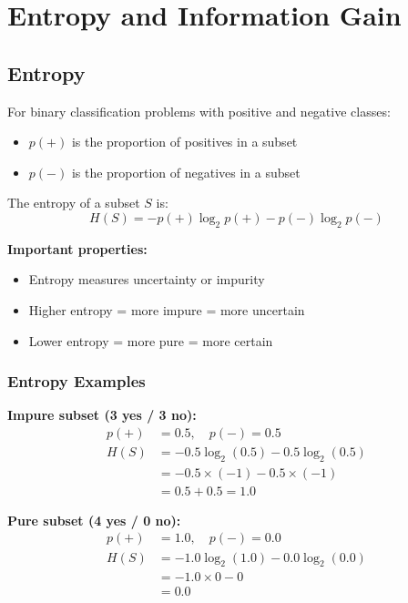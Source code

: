 \documentclass[11pt,a4paper]{article}
\theoremstyle{definition}
\theoremstyle{plain}
\theoremstyle{remark}
\begin{document}
\section{Entropy and Information Gain}

\subsection{Entropy}

For binary classification problems with positive and negative classes:

\begin{itemize}
    \item \(p(+)\) is the proportion of positives in a subset
    \item \(p(-)\) is the proportion of negatives in a subset
\end{itemize}

\begin{tcolorbox}[colback=green!5!white,colframe=green!75!black,title=\textbf{Entropy Formula}]
The entropy of a subset \(S\) is:
\[
H(S) = -p(+) \log_2 p(+) - p(-) \log_2 p(-)
\]
\end{tcolorbox}

\textbf{Important properties:}
\begin{itemize}
    \item Entropy measures uncertainty or impurity
    \item Higher entropy = more impure = more uncertain
    \item Lower entropy = more pure = more certain
\end{itemize}

\subsubsection{Entropy Examples}

\textbf{Impure subset (3 yes / 3 no):}
\begin{align*}
p(+) &= 0.5, \quad p(-) = 0.5 \\
H(S) &= -0.5 \log_2(0.5) - 0.5 \log_2(0.5) \\
&= -0.5 \times (-1) - 0.5 \times (-1) \\
&= 0.5 + 0.5 = 1.0
\end{align*}

\textbf{Pure subset (4 yes / 0 no):}
\begin{align*}
p(+) &= 1.0, \quad p(-) = 0.0 \\
H(S) &= -1.0 \log_2(1.0) - 0.0 \log_2(0.0) \\
&= -1.0 \times 0 - 0 \\
&= 0.0
\end{align*}
\end{document}
